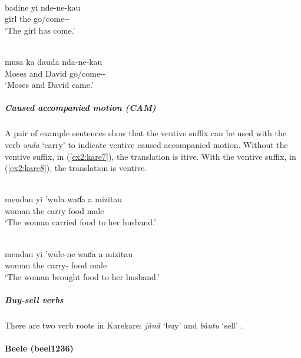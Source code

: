 \ea\label{ex2:kare5}
 \\
\gll badine yi nde-ne-kau	\\
	 girl the go/come--	\\
\glt `The girl has come.'

\ex\label{ex2:kare6}
 \\
\gll musa ka dauda nda-ne-kau \\
Moses and David go/come--	\\
\glt `Moses and David came.'
\z 

\subparagraph{Caused accompanied motion (CAM)}



A pair of example sentences show that the ventive suffix can be used with the verb \textit{wula} `carry' to indicate ventive caused accompanied motion. Without the ventive suffix, in (\ref{ex2:kare7}), the translation is itive. With the ventive suffix, in (\ref{ex2:kare8}), the translation is ventive.

\ea\label{ex2:kare7}
 \\
\gll mendau yi 'wula waɗa a mizitau	\\ 
woman the carry food  male \\
\glt `The woman carried food to her husband.'

\ex\label{ex2:kare8}
 \\
\gll mendau yi 'wule-ne waɗa a mizitau \\
woman the carry- food  male	\\
\glt `The woman brought food to her husband.'
\z 

\subparagraph{Buy-sell verbs}



There are two verb roots in Karekare: \textit{jànā} `buy' and \textit{bàutu} `sell' \citep[6, 28, 62, 81]{gamboKarekareEnglishHausaDictionary2004}. 

\paragraph*{Beele (beel1236)}  \label{beel}

